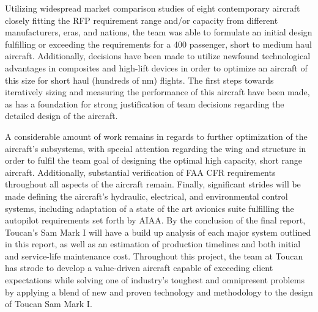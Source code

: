 Utilizing widespread market comparison studies of eight contemporary aircraft closely fitting the RFP requirement range and/or capacity from different manufacturers, eras, and nations, the team was able to formulate an initial design fulfilling or exceeding the requirements for a 400 passenger, short to medium haul aircraft. Additionally, decisions have been made to utilize newfound technological advantages in composites and high-lift devices in order to optimize  an aircraft of this size for short haul (hundreds of nm) flights.  The first steps towards iteratively sizing and measuring the performance of this aircraft have been made, as has a foundation for strong justification of team decisions regarding the detailed design of the aircraft.

A considerable amount of work remains in regards to further optimization of the aircraft's subsystems, with special attention regarding the wing and structure in order to fulfil the team goal of designing the optimal high capacity, short range aircraft.  Additionally, substantial verification of FAA CFR requirements throughout all aspects of the aircraft remain.  Finally, significant strides will be made defining the aircraft's hydraulic, electrical, and environmental control systems, including adaptation of a state of the art avionics suite fulfilling the autopilot requirements set forth by AIAA.  By the conclusion of the final report, Toucan's Sam Mark I will have a build up analysis of each major system outlined in this report, as well as an estimation of production timelines and both initial and service-life maintenance cost.  Throughout this project, the team at Toucan has strode to develop a value-driven aircraft capable of exceeding client expectations while solving one of industry's toughest and omnipresent problems by applying a blend of new and proven technology and methodology to the design of Toucan Sam Mark I.  



